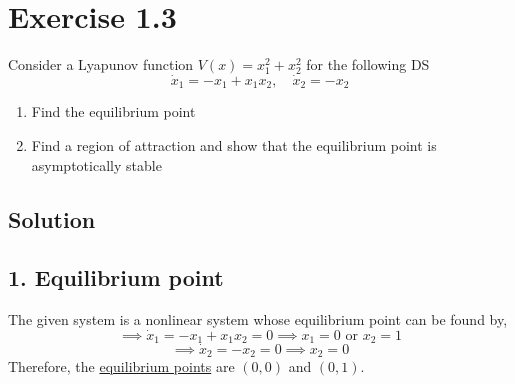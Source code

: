 \section*{Exercise 1.3}

Consider a Lyapunov function \( V(x)=x_{1}^{2}+x_{2}^{2} \) for the following DS
\begin{equation*}
    \dot{x}_{1}=-x_{1}+x_{1} x_{2}, \quad \dot{x}_{2}=-x_{2}
\end{equation*}
\begin{enumerate}[noitemsep]
    \item Find the equilibrium point
    \item Find a region of attraction and show that the equilibrium point is asymptotically stable
\end{enumerate}

\subsection*{Solution}

\subsection*{1. Equilibrium point}

The given system is a nonlinear system whose equilibrium point can be found by,
\[
    \implies
    \dot{x}_{1} = -x_{1} + x_{1} x_{2} = 0
    \implies
    x_{1} = 0 \text{ or } x_{2} = 1
\]
\[
    \implies
    \dot{x}_{2} = -x_{2} = 0
    \implies
    x_{2} = 0
\]
Therefore, the \underline{equilibrium points} are \( \boxed{ (0, 0) } \) and \( \boxed{ (0, 1) } \).
